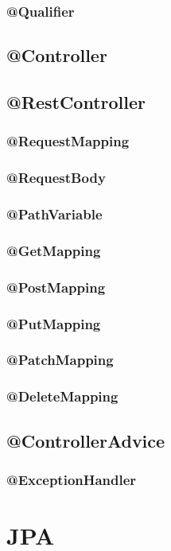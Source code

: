 \documentclass[12pt,article,oneside]{memoir}
\begin{document}
				\subsubsection{@Qualifier}
			\subsection{@Controller}
			\subsection{@RestController}
				\subsubsection{@RequestMapping}
				\subsubsection{@RequestBody}
				\subsubsection{@PathVariable}
				\subsubsection{@GetMapping}
				\subsubsection{@PostMapping}
				\subsubsection{@PutMapping}
				\subsubsection{@PatchMapping}
				\subsubsection{@DeleteMapping}
			\subsection{@ControllerAdvice}
				\subsubsection{@ExceptionHandler}
	\newpage
		\section{JPA}
	\newpage
\end{document}
